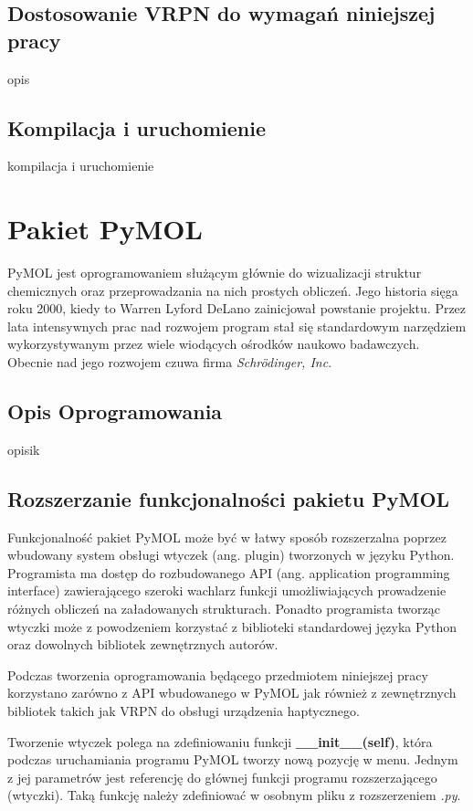 \documentclass[licencjacka]{pracamgr}
\begin{document}
\section{Dostosowanie VRPN do wymagań niniejszej pracy}
opis

\section{Kompilacja i uruchomienie}
kompilacja i uruchomienie

\chapter{Pakiet PyMOL}
PyMOL jest oprogramowaniem służącym głównie do wizualizacji struktur chemicznych oraz przeprowadzania na nich prostych obliczeń. Jego historia sięga roku 2000, kiedy to Warren Lyford DeLano zainicjował powstanie projektu. Przez lata intensywnych prac nad rozwojem program stał się standardowym narzędziem wykorzystywanym przez wiele wiodących ośrodków naukowo badawczych. Obecnie nad jego rozwojem czuwa firma \textit{Schrödinger, Inc}.

\section{Opis Oprogramowania}
opisik

\section{Rozszerzanie funkcjonalności pakietu PyMOL}
Funkcjonalność pakiet PyMOL może być w łatwy sposób rozszerzalna poprzez wbudowany system obsługi wtyczek (ang. plugin) tworzonych w języku Python. Programista ma dostęp do rozbudowanego API (ang. application programming interface) zawierającego szeroki wachlarz funkcji umożliwiających prowadzenie różnych obliczeń na załadowanych strukturach. Ponadto programista tworząc wtyczki może z powodzeniem korzystać z biblioteki standardowej języka Python oraz dowolnych bibliotek zewnętrznych autorów.

Podczas tworzenia oprogramowania będącego przedmiotem niniejszej pracy korzystano zarówno z API wbudowanego w PyMOL jak również z zewnętrznych bibliotek takich jak VRPN do obsługi urządzenia haptycznego.

Tworzenie wtyczek polega na zdefiniowaniu funkcji \textbf{\_\_init\_\_(self)}, która podczas uruchamiania programu PyMOL tworzy nową pozycję w menu. Jednym z jej parametrów jest referencję do głównej funkcji programu rozszerzającego (wtyczki). Taką funkcję należy zdefiniować w osobnym pliku z rozszerzeniem \textit{.py}.
\end{document}
